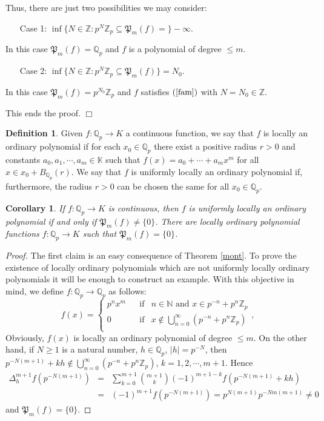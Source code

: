 \documentclass[12pt,a4paper]{amsart}
\newtheorem{corollary}[theorem]{Corollary}
\theoremstyle{definition}
\newtheorem{definition}[theorem]{Definition}
\begin{document}
Thus, there are just two possibilities we may consider:
\begin{itemize}
\item[Case 1:]  $\inf\{N\in\mathbb{Z}:p^N\mathbb{Z}_p\subseteq \mathfrak{P}_m(f)=\}-\infty$.  
\end{itemize}
\noindent In this case $\mathfrak{P}_m(f)=\mathbb{Q}_p$ and $f$ is a polynomial of degree $\leq m$.
\begin{itemize}
\item[Case 2: ] $\inf\{N\in\mathbb{Z}:p^N\mathbb{Z}_p\subseteq \mathfrak{P}_m(f)\}=N_0$.  \end{itemize}

\noindent In this case
 $\mathfrak{P}_m(f)=p^{N_0}\mathbb{Z}_p$ and $f$ satisfies $(\ref{fam})$ with $N=N_0\in\mathbb{Z}$.

This ends the proof. {\hfill $\Box$}

\begin{definition} Given $f:\mathbb{Q}_p\to K$ a continuous function, we say that $f$ is locally an ordinary polynomial if for each $x_0\in \mathbb{Q}_p$ there exist a positive radius $r>0$ and constants $a_0,a_1,\cdots,a_m\in \mathbb{K}$ such that $f(x)=a_0+\cdots+a_mx^m$ for all $x\in x_0+B_{\mathbb{Q}_p}(r)$. We say that $f$ is uniformly locally an ordinary polynomial if, furthermore,  the radius $r>0$ can be chosen the same for all $x_0\in\mathbb{Q}_p$. 
\end{definition}

\begin{corollary}\label{cor_montel} If $f:\mathbb{Q}_p\to K$ is continuous, then $f$ is uniformly locally an ordinary polynomial if and only if  $\mathfrak{P}_m(f)\neq \{0\}$. There are locally ordinary polynomial functions   $f:\mathbb{Q}_p\to K$ such that  $\mathfrak{P}_m(f)= \{0\}$.
\end{corollary}

\begin{proof} The first claim is an easy consequence of Theorem \ref{mont}. To prove the existence of locally ordinary polynomials which are not uniformly locally ordinary polynomials it will be enough to construct an example. With this objective in mind, we define $f:\mathbb{Q}_p\to\mathbb{Q}_p$ as follows:
 \[
f(x)=\left\{
\begin{array}{cccccc}
p^n x^m &  & \text{if} & n\in\mathbb{N}  \text{ and }  x\in p^{-n}+p^n\mathbb{Z}_p\\
0 &  & \text{if} & x\not\in  \bigcup_{n=0}^{\infty} (p^{-n}+p^n\mathbb{Z}_p)\\
\end{array},
\right.
\]
Obviously, $f(x)$ is locally an ordinary polynomial of degree $\leq m$. On the other hand, if $N\geq 1$ is a natural number, $h\in\mathbb{Q}_p$, $|h|=p^{-N}$, then $p^{-N(m+1)}+kh\not\in  \bigcup_{n=0}^{\infty} (p^{-n}+p^n\mathbb{Z}_p)$, $k=1,2,\cdots,m+1$. Hence  
\begin{eqnarray*}
\Delta_h^{m+1}f(p^{-N(m+1)}) &= & \sum_{k=0}^{m+1} \binom{m+1}{k}(-1)^{m+1-k}f(p^{-N(m+1)}+kh) \\
&=&  (-1)^{m+1}f(p^{-N(m+1)}) =p^{N(m+1)} p^{-Nm(m+1)} \neq 0 
\end{eqnarray*}
and $\mathfrak{P}_m(f)= \{0\}$.
\end{proof}
\end{document}

